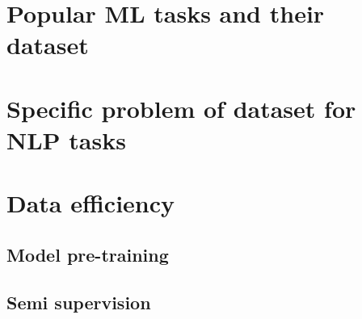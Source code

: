 \documentclass[9pt]{beamer}
\begin{document}
\section{Popular ML tasks and their dataset}

\begin{frame}

\end{frame}

\section{Specific problem of dataset for NLP tasks}

\begin{frame}

\end{frame}

\section{Data efficiency}

\subsection{Model pre-training}

\begin{frame}

\end{frame}

\subsection{Semi supervision}

\begin{frame}

\end{frame}

\end{document}
